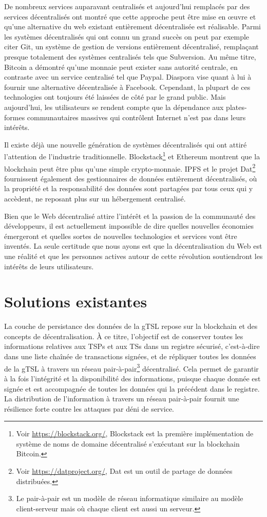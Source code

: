 \documentclass{tnreport}
\begin{document}
De nombreux services auparavant centralisés et aujourd'hui remplacés par des services décentralisés ont montré que cette approche peut être mise en œuvre et qu'une alternative du web existant entièrement décentralisée est réalisable. 
Parmi les systèmes décentralisés qui ont connu un grand succès on peut par exemple citer Git, un système de gestion de versions entièrement décentralisé, remplaçant presque totalement des systèmes centralisés tels que Subversion. 
Au même titre, Bitcoin a démontré qu'une monnaie peut exister sans autorité centrale, en contraste avec un service centralisé tel que Paypal. 
Diaspora vise quant à lui à fournir une alternative décentralisée à Facebook.
Cependant, la plupart de ces technologies ont toujours été laissées de côté par le grand public. Mais aujourd'hui, les utilisateurs se rendent compte que la dépendance aux plates-formes communautaires massives qui contrôlent Internet n'est pas dans leurs intérêts.

Il existe déjà une nouvelle génération de systèmes décentralisés qui ont attiré l'attention de l'industrie traditionnelle.
Blockstack\footnote{Voir \url{https://blockstack.org/}, Blockstack est la première implémentation de système de noms de domaine décentralisé s'exécutant sur la blockchain Bitcoin.} et Ethereum montrent que la blockchain peut être plus qu'une simple crypto-monnaie. IPFS et le projet Dat\footnote{Voir \url{https://datproject.org/}, Dat est un outil de partage de données distribuées.} fournissent également des gestionnaires de données entièrement décentralisés, où la propriété et la responsabilité des données sont partagées par tous ceux qui y accèdent, ne reposant plus sur un hébergement centralisé.

Bien que le Web décentralisé attire l'intérêt et la passion de la communauté des développeurs, il est actuellement impossible de dire quelles nouvelles économies émergeront et quelles sortes de nouvelles technologies et services vont être inventés. La seule certitude que nous ayons est que la décentralisation du Web est une réalité et que les personnes actives autour de cette révolution soutiendront les intérêts de leurs utilisateurs.

\section{Solutions existantes}
\label{sec:solutions}

La couche de persistance des données de la gTSL repose sur la blockchain et des concepts de décentralisation. À ce titre, l'objectif est de conserver toutes les informations relatives aux TSPs et aux TSs dans un registre sécurisé, c'est-à-dire dans une liste chaînée de transactions signées, et de répliquer toutes les données de la gTSL à travers un réseau pair-à-pair\footnote{Le pair-à-pair est un modèle de réseau informatique similaire au modèle client-serveur mais où chaque client est aussi un serveur.} décentralisé.
Cela permet de garantir à la fois l'intégrité et la disponibilité des informations, puisque chaque donnée est signée et est accompagnée de toutes les données qui la précédent dans le registre. La distribution de l'information à travers un réseau pair-à-pair fournit une résilience forte contre les attaques par déni de service.
\end{document}
